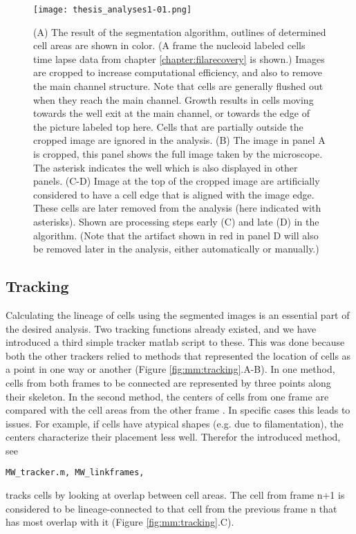 \begin{figure}
	\centering
	\texttt{[image: thesis\_analyses1-01.png]}
	\caption{ 
		 (A) The result of the segmentation algorithm, outlines of determined cell areas are shown in color.  (A frame the nucleoid labeled cells time lapse data from chapter \ref{chapter:filarecovery} is shown.) Images are cropped to increase computational efficiency, and also to remove the main channel structure. Note that cells are generally flushed out when they reach the main channel. Growth results in cells moving towards the well exit at the main channel, or towards the edge of the picture labeled top here. Cells that are partially outside the cropped image are ignored in the analysis.
		 (B) The image in panel A is cropped, this panel shows the full image taken by the microscope. The asterisk indicates the well which is also displayed in other panels.
		 (C-D) Image at the top of the cropped image are artificially considered to have a cell edge that is aligned with the image edge. These cells are later removed from the analysis (here indicated with asterisks). Shown are processing steps early (C) and late (D) in the algorithm. (Note that the artifact shown in red in panel D will also be removed later in the analysis, either automatically or manually.)
	}
	\label{fig:mm:segmentation}
\end{figure}

\subsection{Tracking}

Calculating the lineage of cells using the segmented images is an essential part of the desired analysis.
Two tracking functions already existed, and we have introduced a third simple tracker matlab script to these.
%
This was done because both the other trackers relied to methods that represented the location of cells as a point in one way or another (Figure \ref{fig:mm:tracking}.A-B).
In one method, cells from both frames to be connected are represented by three points along their skeleton.
In the second method, the centers of cells from one frame are compared with the cell areas from the other frame \cite{Walker2016t}.
%
In specific cases this leads to issues. For example, if cells have atypical shapes (e.g. due to filamentation), the centers characterize their placement less well.
Therefor the introduced method, see
\begin{verbatim}
MW_tracker.m, MW_linkframes, 
\end{verbatim}
tracks cells by looking at overlap between cell areas.
The cell from frame n+1 is considered to be lineage-connected to that cell from the previous frame n that has most overlap with it (Figure \ref{fig:mm:tracking}.C).

